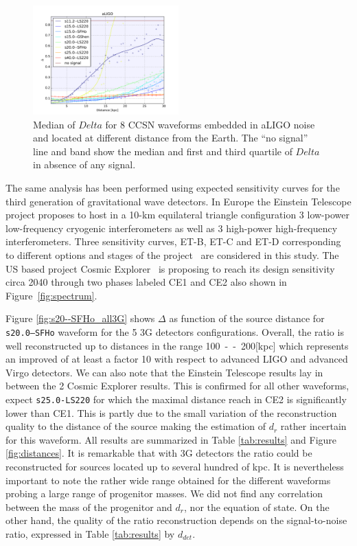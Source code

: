 \begin{figure}
  \centering
  \includegraphics[width=0.5\textwidth]{plots/aLIGO_delta_allwvfs}
 \caption{Median of $Delta$ for 8 CCSN waveforms embedded in aLIGO noise and located at different distance from the Earth. The ``no signal'' line and band show the median and first and third quartile of $Delta$ in absence of any signal.} \label{fig:aLIGO_prec_allwvf}
\end{figure}

The same analysis has been performed using expected sensitivity curves for the third generation of
gravitational wave detectors. In Europe the Einstein Telescope project proposes to host in a 10-km
equilateral triangle configuration 3 low-power low-frequency cryogenic interferometers as well as 3
high-power high-frequency interferometers. Three sensitivity curves, ET-B, ET-C and ET-D corresponding
to different options and stages of the project~\cite{Hild_2011} are considered in this study.
The US based project Cosmic Explorer~\cite{reitze2019cosmic} is proposing to reach its design
sensitivity circa 2040 through two phases labeled CE1 and CE2 also shown in Figure~\ref{fig:spectrum}. 

Figure \ref{fig:s20--SFHo_all3G} shows $\Delta$ as function of the source distance for {\tt s20.0--SFHo}
waveform for the 5 3G detectors configurations. Overall, the ratio is well reconstructed up to distances
in the range \unit{100--200}[kpc] which represents an improved of at least a factor 10 with respect to
advanced LIGO and advanced Virgo detectors. We can also note that the Einstein Telescope results lay in
between the 2 Cosmic Explorer results. This is confirmed for all other waveforms, expect {\tt s25.0-LS220}
for which the maximal distance reach in CE2 is significantly lower than CE1. This is partly due to the
small variation of the reconstruction quality to the distance of the source making the estimation of $d_r$
rather incertain for this waveform. All results are summarized in Table \ref{tab:results} and Figure
\ref{fig:distances}. It is remarkable that with 3G detectors the ratio could be reconstructed for sources
located up to several hundred of kpc. It is nevertheless important to note the rather wide range obtained
for the different waveforms probing a large range of progenitor masses.
We did not find any correlation between the mass of the progenitor and $d_r$, nor the equation of state.
On the other hand, the quality
of the ratio reconstruction depends on the signal-to-noise ratio, expressed in Table \ref{tab:results} by
$d_{det}$.

